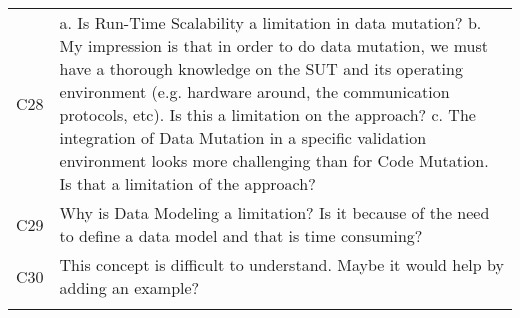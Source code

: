 \begin{longtable}{|p{1.2cm}|p{12cm}|@{}}
C28&
a. Is Run-Time Scalability a limitation in data mutation?
b. My impression is that in order to do data mutation, we must have a thorough knowledge on the SUT and its operating environment (e.g. hardware
around, the communication protocols, etc). Is this a limitation on the approach?
c. The integration of Data Mutation in a specific validation environment looks more challenging than for Code Mutation. Is that a limitation of the
approach?
\\


C29&
Why is Data Modeling a limitation? Is it because of the need to define a data model and that is time consuming?
\\


C30&
This concept is difficult to understand. Maybe it would help by adding an example?
\\

\\



\bottomrule                                                             
\end{longtable}
\normalsize

\clearpage